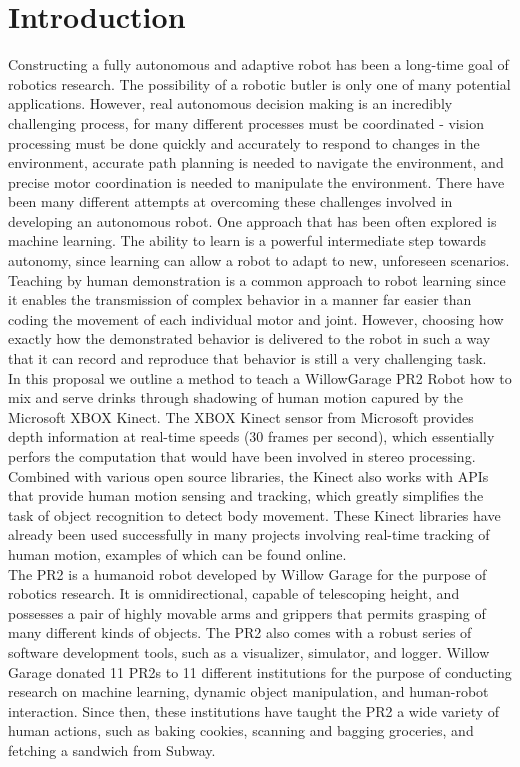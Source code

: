 \documentclass{sig-alternate}
\begin{document}
\section{Introduction}
\label{sec:intro}
Constructing a fully autonomous and adaptive robot has been a long-time goal of robotics research. The possibility of a robotic butler is only one of many potential applications. However, real autonomous decision making is an incredibly challenging process, for many different processes must be coordinated - vision processing must be done quickly and accurately to respond to changes in the environment, accurate path planning is needed to navigate the environment, and precise motor coordination is needed to manipulate the environment. There have been many different attempts at overcoming these challenges involved in developing an autonomous robot. One approach that has been often explored is machine learning. The ability to learn is a powerful intermediate step towards autonomy, since learning can allow a robot to adapt to new, unforeseen scenarios. Teaching by human demonstration is a common approach to robot learning since it enables the transmission of complex behavior in a manner far easier than coding the movement of each individual motor and joint. However, choosing how exactly how the demonstrated behavior is delivered to the robot in such a way that it can record and reproduce that behavior is still a very challenging task.\\ 

In this proposal we outline a method to teach a WillowGarage PR2 Robot how to mix and serve drinks through shadowing of human motion capured by the Microsoft XBOX Kinect. The XBOX Kinect sensor from Microsoft provides depth information at real-time speeds (30 frames per second), which essentially perfors the computation that would have been involved in stereo processing. Combined with various open source libraries\cite{kinect}, the Kinect also works with APIs that provide human motion sensing and tracking, which greatly simplifies the task of object recognition to detect body movement. These Kinect libraries have already been used successfully in many projects involving real-time tracking of human motion, examples of which can be found online\cite{freenect}.\\

The PR2 is a humanoid robot developed by  Willow Garage\cite{pr2} for the purpose of robotics research. It is omnidirectional, capable of telescoping height, and possesses a pair of highly movable arms and grippers that permits grasping of many different kinds of objects. The PR2 also comes with a robust series of software development tools, such as a visualizer, simulator, and logger. Willow Garage donated 11 PR2s to 11 different institutions for the purpose of conducting research on machine learning, dynamic object manipulation, and human-robot interaction\cite{ros_pr2}. Since then, these institutions have taught the PR2 a wide variety of human actions, such as baking cookies\cite{cookies}, scanning and bagging groceries\cite{groceries}, and fetching a sandwich from Subway\cite{subway}.\\
\end{document}
